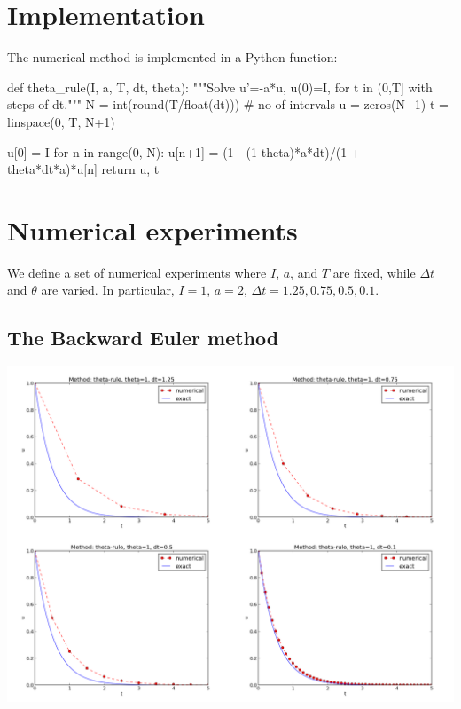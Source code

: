 \documentclass[twoside]{book}
\begin{document}
\noindent


\section{Implementation}

The numerical method is implemented in a Python function:

\bpycod
def theta_rule(I, a, T, dt, theta):
    """Solve u'=-a*u, u(0)=I, for t in (0,T] with steps of dt."""
    N = int(round(T/float(dt)))  # no of intervals
    u = zeros(N+1)
    t = linspace(0, T, N+1)

    u[0] = I
    for n in range(0, N):
        u[n+1] = (1 - (1-theta)*a*dt)/(1 + theta*dt*a)*u[n]
    return u, t
\epycod



\section{Numerical experiments}


We define a set of numerical experiments where $I$, $a$, and $T$ are
fixed, while $\Delta t$ and $\theta$ are varied.
In particular, $I=1$, $a=2$, $\Delta t = 1.25, 0.75, 0.5, 0.1$.




\subsection{The Backward Euler method}



\begin{center}  %
  \centerline{\includegraphics[width=0.9\linewidth]{BE.png}}
\end{center}
\end{document}
